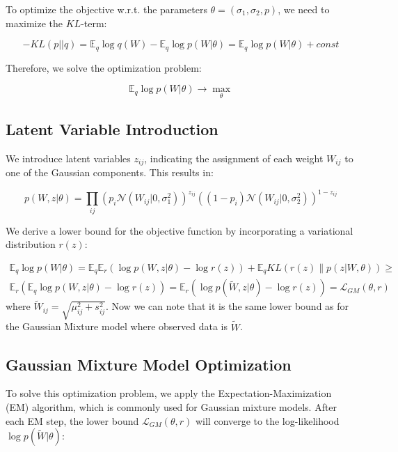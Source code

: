 \documentclass{article}
\newcommand{\N}{\mathcal{N}}
\newcommand{\E}{\mathbb{E}}
\renewcommand{\L}{\mathcal{L}}
\begin{document}
To optimize the objective w.r.t. the parameters $\theta = (\sigma_1, \sigma_2, p)$, we need to maximize the $KL$-term:

\begin{equation}
    -KL(p||q) = \E_q \log q(W) - \E_q \log p(W|\theta) = \E_q \log p(W|\theta) + const
\end{equation}

Therefore, we solve the optimization problem:

\begin{equation}
    \E_q \log p(W|\theta) \to \max_{\theta}
\end{equation}

\subsection{Latent Variable Introduction}

We introduce latent variables $z_{ij}$, indicating the assignment of each weight $W_{ij}$ to one of the Gaussian components. This results in:

\begin{equation}
    p(W, z | \theta) = \prod_{ij} \left(p_i\N(W_{ij}|0, \sigma_1^2)\right)^{z_{ij}}\left((1 - p_i)\N(W_{ij}|0, \sigma_2^2)\right)^{1 - z_{ij}}
\end{equation}

We derive a lower bound for the objective function by incorporating a variational distribution $r(z)$:

\begin{multline}
    \E_q \log p(W|\theta) =
    \E_q \E_r \left( \log p(W, z|\theta) - \log r(z) \right) + \E_q KL(r(z) \| p(z|W, \theta)) \ge\\
    \E_r \left( \E_q \log p(W, z|\theta) - \log r(z) \right) =
    \E_r \left( \log p(\tilde W, z|\theta) - \log r(z) \right) = \L_{GM}(\theta, r)
\end{multline}
where $\tilde{W}_{ij} = \sqrt{\mu_{ij}^2 + s_{ij}^2}$. Now we can note that it is the same lower bound as for the Gaussian Mixture model where observed data is $\tilde W$.

\subsection{Gaussian Mixture Model Optimization}

To solve this optimization problem, we apply the Expectation-Maximization (EM) algorithm, which is commonly used for Gaussian mixture models. After each EM step, the lower bound $\L_{GM}(\theta, r)$ will converge to the log-likelihood $\log p(\tilde{W}|\theta)$:
\end{document}
